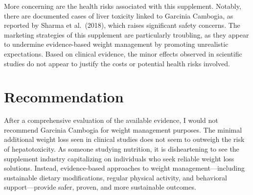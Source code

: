 \documentclass[12pt]{article}
\begin{document}
More concerning are the health risks associated with this supplement. Notably, there are documented cases of liver toxicity linked to Garcinia Cambogia, as reported by Sharma et al.\ (2018), which raises significant safety concerns. The marketing strategies of this supplement are particularly troubling, as they appear to undermine evidence-based weight management by promoting unrealistic expectations. Based on clinical evidence, the minor effects observed in scientific studies do not appear to justify the costs or potential health risks involved.

\section*{Recommendation}
After a comprehensive evaluation of the available evidence, I would not recommend Garcinia Cambogia for weight management purposes. The minimal additional weight loss seen in clinical studies does not seem to outweigh the risk of hepatotoxicity. As someone studying nutrition, it is disheartening to see the supplement industry capitalizing on individuals who seek reliable weight loss solutions. Instead, evidence-based approaches to weight management---including sustainable dietary modifications, regular physical activity, and behavioral support---provide safer, proven, and more sustainable outcomes.
\end{document}
